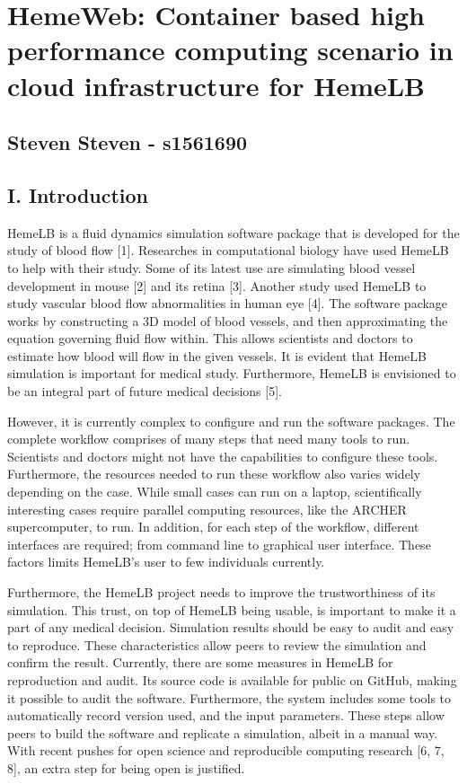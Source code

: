 \documentclass[]{article}
\date{}
\begin{document}
\section{HemeWeb: Container based high performance computing scenario in
cloud infrastructure for
HemeLB}\label{hemeweb-container-based-high-performance-computing-scenario-in-cloud-infrastructure-for-hemelb}

\subsection{Steven Steven - s1561690}\label{steven-steven---s1561690}

\subsection{I. Introduction}\label{i.-introduction}

HemeLB is a fluid dynamics simulation software package that is developed
for the study of blood flow {[}1{]}. Researches in computational biology
have used HemeLB to help with their study. Some of its latest use are
simulating blood vessel development in mouse {[}2{]} and its retina
{[}3{]}. Another study used HemeLB to study vascular blood flow
abnormalities in human eye {[}4{]}. The software package works by
constructing a 3D model of blood vessels, and then approximating the
equation governing fluid flow within. This allows scientists and doctors
to estimate how blood will flow in the given vessels. It is evident that
HemeLB simulation is important for medical study. Furthermore, HemeLB is
envisioned to be an integral part of future medical decisions {[}5{]}.

However, it is currently complex to configure and run the software
packages. The complete workflow comprises of many steps that need many
tools to run. Scientists and doctors might not have the capabilities to
configure these tools. Furthermore, the resources needed to run these
workflow also varies widely depending on the case. While small cases can
run on a laptop, scientifically interesting cases require parallel
computing resources, like the ARCHER supercomputer, to run. In addition,
for each step of the workflow, different interfaces are required; from
command line to graphical user interface. These factors limits HemeLB's
user to few individuals currently.

Furthermore, the HemeLB project needs to improve the trustworthiness of
its simulation. This trust, on top of HemeLB being usable, is important
to make it a part of any medical decision. Simulation results should be
easy to audit and easy to reproduce. These characteristics allow peers
to review the simulation and confirm the result. Currently, there are
some measures in HemeLB for reproduction and audit. Its source code is
available for public on GitHub, making it possible to audit the
software. Furthermore, the system includes some tools to automatically
record version used, and the input parameters. These steps allow peers
to build the software and replicate a simulation, albeit in a manual
way. With recent pushes for open science and reproducible computing
research {[}6, 7, 8{]}, an extra step for being open is justified.
\end{document}
